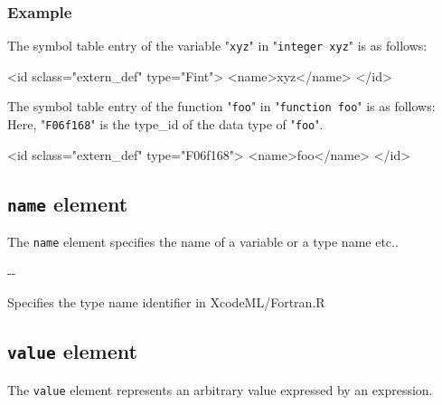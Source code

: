 \subsubsection*{Example}

The symbol table entry of the variable "{\tt xyz}" in "{\tt integer xyz}" is as follows:
\vspace{2mm}

\begin{XcodeMLFExample}
<id sclass="extern_def" type="Fint">
  <name>xyz</name>
</id>
\end{XcodeMLFExample}

The symbol table entry of the function "{\tt foo}" in "{\tt function foo}" is as follows:
Here, "{\tt F06f168}" is the type\_id of the data type of "{\tt foo}".
\newline

\begin{XcodeMLFExample}
<id sclass="extern_def" type="F06f168">
  <name>foo</name>
</id>
\end{XcodeMLFExample}


\subsection{ {\tt name} element}

The {\tt name} element specifies the name of a variable or a type name etc..


\begin{XcodeMLChildElements}
\XcodeMLElementDef{-}
{-}{-}
\end{XcodeMLChildElements}

\begin{XcodeMLAttributes}
{Specifies the type name identifier in XcodeML/Fortran.}{R}
\end{XcodeMLAttributes}


\subsection{ {\tt value} element}

The {\tt value} element represents an arbitrary value expressed by an expression.


